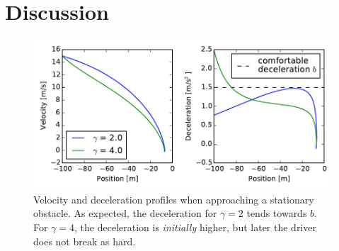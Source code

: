 \section{Discussion}


\begin{figure}
    \centering
    \includegraphics[width=5in]{../img/vel_profile.pdf}
    \caption{Velocity and deceleration profiles when approaching a stationary obstacle. As expected, the deceleration for $\gamma=2$ tends towards $b$. For $\gamma=4$, the deceleration is \emph{initially} higher, but later the driver does not break as hard.}
    \label{fig:vel_profile}
\end{figure}

